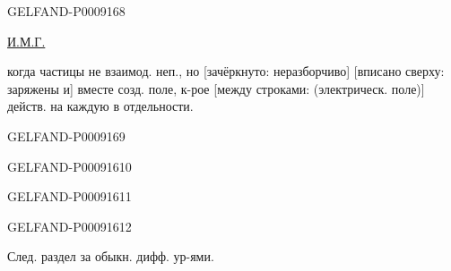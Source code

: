 \begin{GelfandAdjacentEvidence}{GELFAND-P000916}{8}


\uline{И.М.Г.}\quad {}

когда частицы не взаимод. неп., но
[зачёркнуто: неразборчиво]
[вписано сверху: заряжены и] вместе созд. поле, к-рое
[между строками: (электрическ. поле)]
действ. на каждую в отдельности.

\end{GelfandAdjacentEvidence}
\begin{GelfandAdjacentEvidence}{GELFAND-P000916}{9}

\end{GelfandAdjacentEvidence}
\begin{GelfandAdjacentEvidence}{GELFAND-P000916}{10}

\end{GelfandAdjacentEvidence}
\begin{GelfandAdjacentEvidence}{GELFAND-P000916}{11}

\end{GelfandAdjacentEvidence}
\begin{GelfandAdjacentEvidence}{GELFAND-P000916}{12}


След. раздел за обыкн. дифф. ур-ями.
\end{GelfandAdjacentEvidence}



